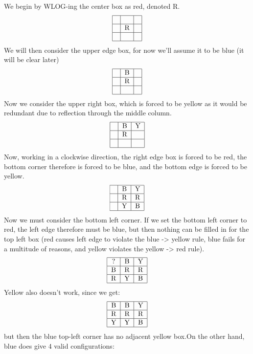 \begin{enumerate}
We begin by WLOG-ing the center box as red, denoted R.
 \[\begin{tabular}{|c|c|c|} \hline  &  &  \\ \hline  & R &  \\ \hline  &  &  \\ \hline \end{tabular}\]We will then consider the upper edge box, for now we'll assume it to be blue (it will be clear later)
 \[\begin{tabular}{|c|c|c|} \hline  & B &  \\ \hline  & R &  \\ \hline  &  &  \\ \hline \end{tabular}\]Now we consider the upper right box, which is forced to be yellow as it would be redundant due to reflection through the middle column.
 \[\begin{tabular}{|c|c|c|} \hline  & B & Y \\ \hline  & R &  \\ \hline  &  &  \\ \hline \end{tabular}\]Now, working in a clockwise direction, the right edge box is forced to be red, the bottom corner therefore is forced to be blue, and the bottom edge is forced to be yellow.
 \[\begin{tabular}{|c|c|c|} \hline  & B & Y \\ \hline  & R & R \\ \hline  & Y & B \\ \hline \end{tabular}\]Now we must consider the bottom left corner. If we set the bottom left corner to red, the left edge therefore must be blue, but then nothing can be filled in for the top left box (red causes left edge to violate the blue -> yellow rule, blue fails for a multitude of reasons, and yellow violates the yellow -> red rule).
 \[\begin{tabular}{|c|c|c|} \hline ? & B & Y \\ \hline B & R & R \\ \hline R & Y & B \\ \hline \end{tabular}\]Yellow also doesn't work, since we get:
 \[\begin{tabular}{|c|c|c|} \hline B & B & Y \\ \hline R & R & R \\ \hline Y & Y & B \\ \hline \end{tabular}\]but then the blue top-left corner has no adjacent yellow box.On the other hand, blue does give $4$ valid configurations:


\end{enumerate}
